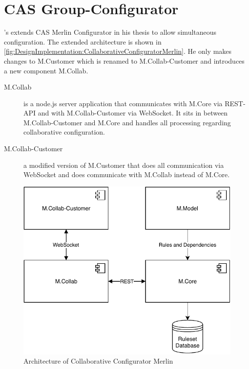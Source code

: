 \section{CAS Group-Configurator}
\label{sec:DesignImplementation:GroupConfigurator}

\citeauthor{raabKollaborativeProduktkonfigurationEchtzeit2019}'s \cite{raabKollaborativeProduktkonfigurationEchtzeit2019} extends CAS Merlin Configurator in his thesis to allow simultaneous configuration. The extended architecture is shown in \autoref{fig:DesignImplementation:CollaborativeConfiguratorMerlin}.
He only makes changes to M.Customer which is renamed to M.Collab-Customer and introduces a new component M.Collab.

\begin{description}
    \item[M.Collab] is a node.js server application that communicates with M.Core via REST-API and with M.Collab-Customer via WebSocket. It sits in between M.Collab-Customer and M.Core and handles all processing regarding collaborative configuration.
    \item[M.Collab-Customer] a modified version of M.Customer that does all communication via WebSocket and does communicate with M.Collab instead of M.Core.
\end{description}

\begin{figure}
    \centering
    \includegraphics{./figures/50_design_and_implementation/MerlinCollaborativeConfigurator.pdf}
    \caption{Architecture of Collaborative Configurator Merlin \cite[Fig. 4.3]{raabKollaborativeProduktkonfigurationEchtzeit2019}}
    \label{fig:DesignImplementation:CollaborativeConfiguratorMerlin}
\end{figure}


